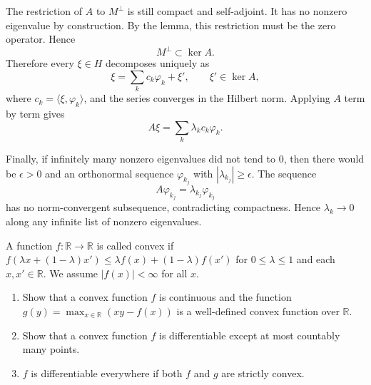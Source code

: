\begin{solution}
The restriction of \(A\) to \(M^\perp\) is still compact and self-adjoint. It has no nonzero eigenvalue by construction. By the lemma, this restriction must be the zero operator. Hence
\[
M^\perp\subset \ker A.
\]
Therefore every \(\xi\in H\) decomposes uniquely as
\[
\xi=\sum_k c_k\varphi_k+\xi',
\qquad
\xi'\in\ker A,
\]
where \(c_k=\langle \xi,\varphi_k\rangle\), and the series converges in the Hilbert norm. Applying \(A\) term by term gives
\[
A\xi=\sum_k \lambda_k c_k\varphi_k.
\]

Finally, if infinitely many nonzero eigenvalues did not tend to \(0\), then there would be \(\epsilon>0\) and an orthonormal sequence \(\varphi_{k_j}\) with \(|\lambda_{k_j}|\geq\epsilon\). The sequence
\[
A\varphi_{k_j}=\lambda_{k_j}\varphi_{k_j}
\]
has no norm-convergent subsequence, contradicting compactness. Hence \(\lambda_k\to0\) along any infinite list of nonzero eigenvalues.
\end{solution}

\begin{exercise}
\label{analysis:2013:12}
A function $f : \mathbb{R} \to \mathbb{R}$ is called convex if $f(\lambda x + (1 - \lambda) x') \leq \lambda f(x) + (1 - \lambda) f(x')$ for $0 \leq \lambda \leq 1$ and each $x, x' \in \mathbb{R}$. We assume $|f(x)| < \infty$ for all $x$.
\begin{enumerate}
    \item Show that a convex function $f$ is continuous and the function $g(y) = \max_{x \in \mathbb{R}} (xy - f(x))$ is a well-defined convex function over $\mathbb{R}$.
    \item Show that a convex function $f$ is differentiable except at most countably many points.
    \item $f$ is differentiable everywhere if both $f$ and $g$ are strictly convex.
\end{enumerate}
\end{exercise}


